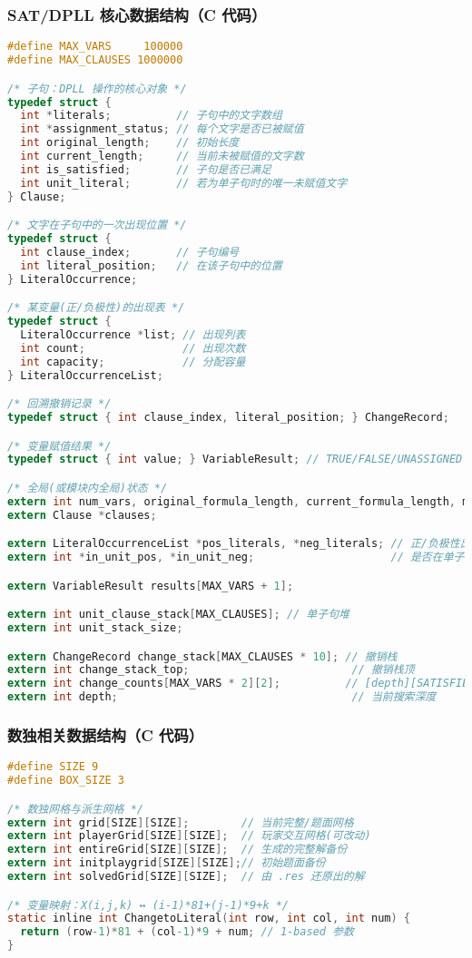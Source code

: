\documentclass[UTF8]{ctexart}
\begin{document}
\subsubsection{SAT/DPLL 核心数据结构（C 代码）}
\begin{lstlisting}[language=C]
#define MAX_VARS     100000
#define MAX_CLAUSES 1000000

/* 子句：DPLL 操作的核心对象 */
typedef struct {
  int *literals;          // 子句中的文字数组
  int *assignment_status; // 每个文字是否已被赋值
  int original_length;    // 初始长度
  int current_length;     // 当前未被赋值的文字数
  int is_satisfied;       // 子句是否已满足
  int unit_literal;       // 若为单子句时的唯一未赋值文字
} Clause;

/* 文字在子句中的一次出现位置 */
typedef struct {
  int clause_index;       // 子句编号
  int literal_position;   // 在该子句中的位置
} LiteralOccurrence;

/* 某变量(正/负极性)的出现表 */
typedef struct {
  LiteralOccurrence *list; // 出现列表
  int count;               // 出现次数
  int capacity;            // 分配容量
} LiteralOccurrenceList;

/* 回溯撤销记录 */
typedef struct { int clause_index, literal_position; } ChangeRecord;

/* 变量赋值结果 */
typedef struct { int value; } VariableResult; // TRUE/FALSE/UNASSIGNED

/* 全局(或模块内全局)状态 */
extern int num_vars, original_formula_length, current_formula_length, max_clause_length;
extern Clause *clauses;

extern LiteralOccurrenceList *pos_literals, *neg_literals; // 正/负极性出现表
extern int *in_unit_pos, *in_unit_neg;                     // 是否在单子句堆

extern VariableResult results[MAX_VARS + 1];

extern int unit_clause_stack[MAX_CLAUSES]; // 单子句堆
extern int unit_stack_size;

extern ChangeRecord change_stack[MAX_CLAUSES * 10]; // 撤销栈
extern int change_stack_top;                         // 撤销栈顶
extern int change_counts[MAX_VARS * 2][2];          // [depth][SATISFIED/SHRUNK]
extern int depth;                                    // 当前搜索深度
\end{lstlisting}

\subsubsection{数独相关数据结构（C 代码）}
\begin{lstlisting}[language=C]
#define SIZE 9
#define BOX_SIZE 3

/* 数独网格与派生网格 */
extern int grid[SIZE][SIZE];        // 当前完整/题面网格
extern int playerGrid[SIZE][SIZE];  // 玩家交互网格(可改动)
extern int entireGrid[SIZE][SIZE];  // 生成的完整解备份
extern int initplaygrid[SIZE][SIZE];// 初始题面备份
extern int solvedGrid[SIZE][SIZE];  // 由 .res 还原出的解

/* 变量映射：X(i,j,k) ↔ (i-1)*81+(j-1)*9+k */
static inline int ChangetoLiteral(int row, int col, int num) {
  return (row-1)*81 + (col-1)*9 + num; // 1-based 参数
}
\end{lstlisting}
\end{document}
